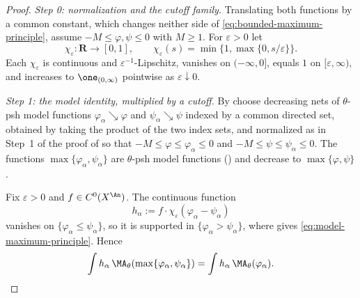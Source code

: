 \begin{proof}
\emph{Step 0: normalization and the cutoff family.}  Translating both
functions by a common constant, which changes neither side of
\eqref{eq:bounded-maximum-principle}, assume \(-M\leq\varphi,\psi\leq0\) with
\(M\geq1\).  For \(\varepsilon>0\) let
\[
 \chi_\varepsilon:\mathbf R\to[0,1],\qquad
 \chi_\varepsilon(s)=\min\{1,\max\{0,s/\varepsilon\}\} .
\]
Each \(\chi_\varepsilon\) is continuous and \(\varepsilon^{-1}\)-Lipschitz,
vanishes on \((-\infty,0]\), equals \(1\) on \([\varepsilon,\infty)\), and
increases to \(\one_{(0,\infty)}\) pointwise as
\(\varepsilon\downarrow0\).

\emph{Step 1: the model identity, multiplied by a cutoff.}  By
 choose decreasing nets of
\(\theta\)-psh model functions \(\varphi_\alpha\searrow\varphi\) and
\(\psi_\alpha\searrow\psi\) indexed by a common directed set, obtained by
taking the product of the two index sets, and normalized as in Step~1 of the
proof of  so that
\(-M\leq\varphi\leq\varphi_\alpha\leq0\) and
\(-M\leq\psi\leq\psi_\alpha\leq0\).  The functions
\(\max\{\varphi_\alpha,\psi_\alpha\}\) are \(\theta\)-psh model functions
() and decrease to \(\max\{\varphi,\psi\}\).

Fix \(\varepsilon>0\) and \(f\in C^0(X^{\An})\).  The continuous function
\[
 h_\alpha:=f\cdot\chi_\varepsilon(\varphi_\alpha-\psi_\alpha)
\]
vanishes on \(\{\varphi_\alpha\leq\psi_\alpha\}\), so it is supported in
\(\{\varphi_\alpha>\psi_\alpha\}\), where
 gives
\eqref{eq:model-maximum-principle}.  Hence
\begin{equation}
\label{eq:ch25-max-model-tested}
 \int h_\alpha\,\MA_\theta(\max\{\varphi_\alpha,\psi_\alpha\})
 =\int h_\alpha\,\MA_\theta(\varphi_\alpha) .
\end{equation}


\end{proof}
